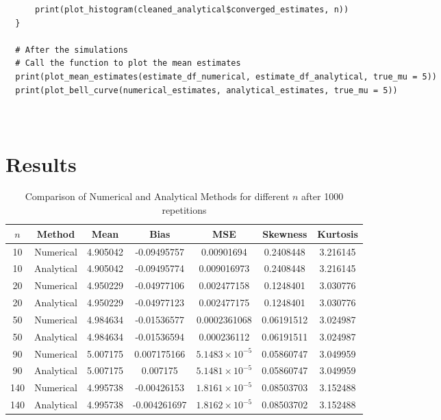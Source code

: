 \documentclass{report}
\begin{document}
\begin{verbatim}
      print(plot_histogram(cleaned_analytical$converged_estimates, n))    
  }
  
  # After the simulations
  # Call the function to plot the mean estimates
  print(plot_mean_estimates(estimate_df_numerical, estimate_df_analytical, true_mu = 5))
  print(plot_bell_curve(numerical_estimates, analytical_estimates, true_mu = 5))
  
  
\end{verbatim}

\section{Results}
\begin{table}[h]
  \centering
  \begin{tabular}{| c | c | c | c | c | c | c |}
    \hline
    $n$ & Method     & Mean     & Bias         & MSE                     & Skewness   & Kurtosis \\
    \hline
    10  & Numerical  & 4.905042 & -0.09495757  & 0.00901694              & 0.2408448  & 3.216145 \\
    10  & Analytical & 4.905042 & -0.09495774  & 0.009016973             & 0.2408448  & 3.216145 \\
    \hline
    20  & Numerical  & 4.950229 & -0.04977106  & 0.002477158             & 0.1248401  & 3.030776 \\
    20  & Analytical & 4.950229 & -0.04977123  & 0.002477175             & 0.1248401  & 3.030776 \\
    \hline
    50  & Numerical  & 4.984634 & -0.01536577  & 0.0002361068            & 0.06191512 & 3.024987 \\
    50  & Analytical & 4.984634 & -0.01536594  & 0.000236112             & 0.06191511 & 3.024987 \\
    \hline
    90  & Numerical  & 5.007175 & 0.007175166  & $5.1483 \times 10^{-5}$ & 0.05860747 & 3.049959 \\
    90  & Analytical & 5.007175 & 0.007175     & $5.1481 \times 10^{-5}$ & 0.05860747 & 3.049959 \\
    \hline
    140 & Numerical  & 4.995738 & -0.00426153  & $1.8161 \times 10^{-5}$ & 0.08503703 & 3.152488 \\
    140 & Analytical & 4.995738 & -0.004261697 & $1.8162 \times 10^{-5}$ & 0.08503702 & 3.152488 \\
    \hline
  \end{tabular}
  \caption{Comparison of Numerical and Analytical Methods for different $n$ after 1000 repetitions}
\end{table}
\end{document}
